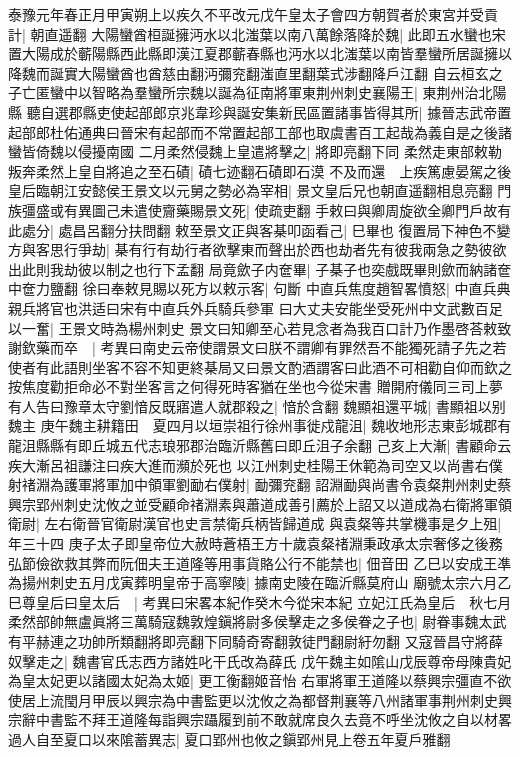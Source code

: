 泰豫元年春正月甲寅朔上以疾久不平改元戊午皇太子會四方朝賀者於東宮并受貢計|{
	朝直遥翻}
大陽蠻酋桓誕擁沔水以北滍葉以南八萬餘落降於魏|{
	此即五水蠻也宋置大陽成於蘄陽縣西此縣即漢江夏郡蘄春縣也沔水以北滍葉以南皆羣蠻所居誕擁以降魏而誕實大陽蠻酋也酋慈由翻沔彌兖翻滍直里翻葉式涉翻降戶江翻}
自云桓玄之子亡匿蠻中以智略為羣蠻所宗魏以誕為征南將軍東荆州刺史襄陽王|{
	東荆州治北陽縣}
聽自選郡縣吏使起部郎京兆韋珍與誕安集新民區置諸事皆得其所|{
	據晉志武帝置起部郎杜佑通典曰晉宋有起部而不常置起部工部也取虞書百工起哉為義自是之後諸蠻皆倚魏以侵擾南國}
二月柔然侵魏上皇遣將擊之|{
	將即亮翻下同}
柔然走東部敕勒叛奔柔然上皇自將追之至石磧|{
	磧七迹翻石磧即石漠}
不及而還　上疾篤慮晏駕之後皇后臨朝江安懿侯王景文以元舅之勢必為宰相|{
	景文皇后兄也朝直遥翻相息亮翻}
門族彊盛或有異圖己未遣使齎藥賜景文死|{
	使疏吏翻}
手敕曰與卿周旋欲全卿門戶故有此處分|{
	處昌呂翻分扶問翻}
敕至景文正與客棊叩函看己|{
	巳畢也}
復置局下神色不變方與客思行爭劫|{
	棊有行有劫行者欲擊東而聲出於西也劫者先有彼我兩急之勢彼欲出此則我劫彼以制之也行下孟翻}
局竟歛子内奩畢|{
	子棊子也奕戲既畢則歛而納諸奩中奩力鹽翻}
徐曰奉敕見賜以死方以敕示客|{
	句斷}
中直兵焦度趙智畧憤怒|{
	中直兵典親兵將官也洪适曰宋有中直兵外兵騎兵參軍}
曰大丈夫安能坐受死州中文武數百足以一奮|{
	王景文時為楊州刺史}
景文曰知卿至心若見念者為我百口計乃作墨啓荅敕致謝欽藥而卒　|{
	考異曰南史云帝使謂景文曰朕不謂卿有罪然吾不能獨死請子先之若使者有此語則坐客不容不知更終棊局又曰景文酌酒謂客曰此酒不可相勸自仰而欽之按焦度勸拒命必不對坐客言之何得死時客猶在坐也今從宋書}
贈開府儀同三司上夢有人告曰豫章太守劉愔反既寤遣人就郡殺之|{
	愔於含翻}
魏顯祖還平城|{
	書顯祖以别魏主}
庚午魏主耕籍田　夏四月以垣崇祖行徐州事徙戍龍沮|{
	魏收地形志東彭城郡有龍沮縣縣有即丘城五代志琅邪郡治臨沂縣舊曰即丘沮子余翻}
己亥上大漸|{
	書顧命云疾大漸呂祖謙注曰疾大進而瀕於死也}
以江州刺史桂陽王休範為司空又以尚書右僕射禇淵為護軍將軍加中領軍劉勔右僕射|{
	勔彌兖翻}
詔淵勔與尚書令袁粲荆州刺史蔡興宗郢州刺史沈攸之並受顧命禇淵素與蕭道成善引薦於上詔又以道成為右衛將軍領衛尉|{
	左右衛晉官衛尉漢官也史言禁衛兵柄皆歸道成}
與袁粲等共掌機事是夕上殂|{
	年三十四}
庚子太子即皇帝位大赦時蒼梧王方十歲袁粲禇淵秉政承太宗奢侈之後務弘節儉欲救其弊而阮佃夫王道隆等用事貨賂公行不能禁也|{
	佃音田}
乙巳以安成王凖為揚州刺史五月戊寅葬明皇帝于高寧陵|{
	據南史陵在臨沂縣莫府山}
廟號太宗六月乙巳尊皇后曰皇太后　|{
	考異曰宋畧本紀作癸木今從宋本紀}
立妃江氏為皇后　秋七月柔然部帥無盧眞將三萬騎寇魏敦煌鎭將尉多侯擊走之多侯眷之子也|{
	尉眷事魏太武有平赫連之功帥所類翻將即亮翻下同騎奇寄翻敦徒門翻尉紆勿翻}
又寇晉昌守將薛奴擊走之|{
	魏書官氏志西方諸姓叱干氏改為薛氏}
戊午魏主如隂山戊辰尊帝母陳貴妃為皇太妃更以諸國太妃為太姬|{
	更工衡翻姬音怡}
右軍將軍王道隆以蔡興宗彊直不欲使居上流閠月甲辰以興宗為中書監更以沈攸之為都督荆襄等八州諸軍事荆州刺史興宗辭中書監不拜王道隆每詣興宗躡履到前不敢就席良久去竟不呼坐沈攸之自以材畧過人自至夏口以來隂蓄異志|{
	夏口郢州也攸之鎭郢州見上卷五年夏戶雅翻}

